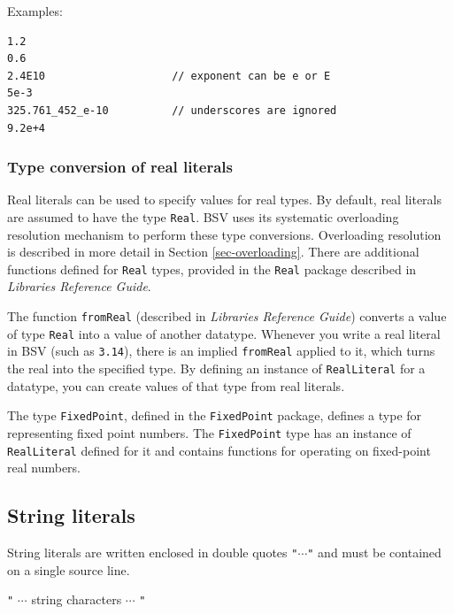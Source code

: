\documentclass[twoside,letterpaper]{article}
\newcommand{\hm}{\hspace*{1em}}
\newcommand{\LibRefGuide}{\emph{Libraries Reference Guide}}
\newcommand{\BSV}{BSV}
\newcommand{\te}[1]{\texttt{#1}}
\newcommand{\term}[1]{\texttt{#1}}
\newcommand{\gram}[2]{    \hm\makebox[10em][l]{\it #1}\makebox[1.5em][l]{::=}    #2}
\begin{document}

Examples:
\begin{verbatim}
1.2
0.6
2.4E10                    // exponent can be e or E
5e-3
325.761_452_e-10          // underscores are ignored
9.2e+4
\end{verbatim}


\subsubsection{Type conversion of real literals}

Real literals can be used to specify values for real types.  By
default, real literals are assumed to have the type \te{Real}. {\BSV}
uses its systematic overloading resolution mechanism to perform these
type conversions.  Overloading resolution is described in more detail
in Section {\ref{sec-overloading}}.  There are additional functions
defined for \te{Real} types, provided in the \te{Real} package
described in {\LibRefGuide}.

The function \te{fromReal} (described in {\LibRefGuide}) converts a
value of type \te{Real} into a value of another datatype.  Whenever
you write a real literal in BSV (such as \te{3.14}), there is an
implied \te{fromReal} applied to it, which turns the real into the
specified type.  By defining an instance of \te{RealLiteral} for a
datatype, you can create values of that type from real literals.

The type \te{FixedPoint}, defined in the \te{FixedPoint} package,
defines a type for representing fixed point numbers.  The
\te{FixedPoint} type has an instance of \te{RealLiteral} defined for
it and contains functions for operating on fixed-point real numbers.


\subsection{String literals}

\label{sec-string-literals}


String literals are written enclosed in double quotes \texttt{"$\cdots$"} and must
be contained on a single source line.

\gram{stringLiteral}{ \term{"} $\cdots$ string characters $\cdots$ \term{"} }
\end{document}
